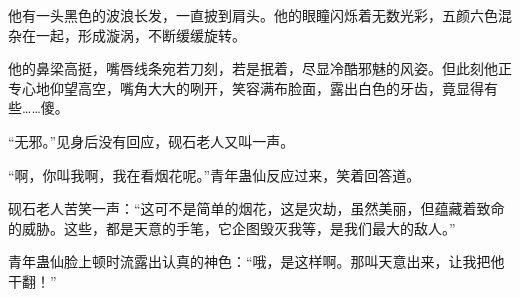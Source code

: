\begin{this_body}
他有一头黑色的波浪长发，一直披到肩头。他的眼瞳闪烁着无数光彩，五颜六色混杂在一起，形成漩涡，不断缓缓旋转。

他的鼻梁高挺，嘴唇线条宛若刀刻，若是抿着，尽显冷酷邪魅的风姿。但此刻他正专心地仰望高空，嘴角大大的咧开，笑容满布脸面，露出白色的牙齿，竟显得有些……傻。

“无邪。”见身后没有回应，砚石老人又叫一声。

“啊，你叫我啊，我在看烟花呢。”青年蛊仙反应过来，笑着回答道。

砚石老人苦笑一声：“这可不是简单的烟花，这是灾劫，虽然美丽，但蕴藏着致命的威胁。这些，都是天意的手笔，它企图毁灭我等，是我们最大的敌人。”

青年蛊仙脸上顿时流露出认真的神色：“哦，是这样啊。那叫天意出来，让我把他干翻！”

\end{this_body}

